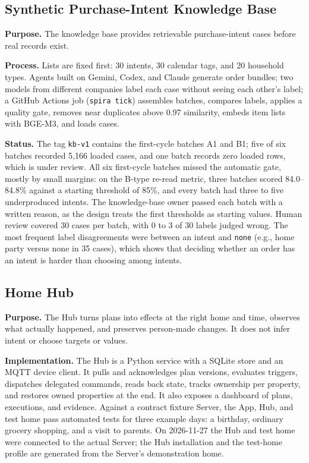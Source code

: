 \documentclass[conference]{IEEEtran}
\begin{document}
\subsection{Synthetic Purchase-Intent Knowledge Base}
\textbf{Purpose.} The knowledge base provides retrievable purchase-intent cases before real records exist.

\textbf{Process.} Lists are fixed first: 30 intents, 30 calendar tags, and 20 household types. Agents built on Gemini, Codex, and Claude generate order bundles; two models from different companies label each case without seeing each other's label; a GitHub Actions job (\texttt{spira tick}) assembles batches, compares labels, applies a quality gate, removes near duplicates above 0.97 similarity, embeds item lists with BGE-M3, and loads cases.

\textbf{Status.} The tag \texttt{kb-v1} contains the first-cycle batches A1 and B1; five of six batches recorded 5,166 loaded cases, and one batch records zero loaded rows, which is under review. All six first-cycle batches missed the automatic gate, mostly by small margins: on the B-type re-read metric, three batches scored 84.0--84.8\% against a starting threshold of 85\%, and every batch had three to five underproduced intents. The knowledge-base owner passed each batch with a written reason, as the design treats the first thresholds as starting values. Human review covered 30 cases per batch, with 0 to 3 of 30 labels judged wrong. The most frequent label disagreements were between an intent and \texttt{none} (e.g., home party versus none in 35 cases), which shows that deciding whether an order has an intent is harder than choosing among intents.

\subsection{Home Hub}
\textbf{Purpose.} The Hub turns plans into effects at the right home and time, observes what actually happened, and preserves person-made changes. It does not infer intent or choose targets or values.

\textbf{Implementation.} The Hub is a Python service with a SQLite store and an MQTT device client. It pulls and acknowledges plan versions, evaluates triggers, dispatches delegated commands, reads back state, tracks ownership per property, and restores owned properties at the end. It also exposes a dashboard of plans, executions, and evidence. Against a contract fixture Server, the App, Hub, and test home pass automated tests for three example days: a birthday, ordinary grocery shopping, and a visit to parents. On 2026-11-27 the Hub and test home were connected to the actual Server; the Hub installation and the test-home profile are generated from the Server's demonstration home.
\end{document}
